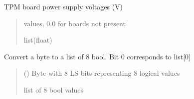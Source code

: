 \documentclass[letterpaper,10pt,english]{sphinxmanual}
\begin{document}
\begin{fulllineitems}
\label{\detokenize{webserverdocs:subrack_hardware.TpmVoltages}}
\pysigstartsignatures
{}
\pysigstopsignatures
\sphinxAtStartPar
TPM board power supply voltages (V)

\begin{fulllineitems}
\label{\detokenize{webserverdocs:subrack_hardware.TpmVoltages.read_value}}
\pysigstartsignatures
{}
\pysigstopsignatures\begin{quote}\begin{description}
 values, 0.0 for boards not present

\sphinxAtStartPar
list(float)

\end{description}\end{quote}

\end{fulllineitems}


\end{fulllineitems}


\begin{fulllineitems}
\label{\detokenize{webserverdocs:subrack_hardware.byte_to_bool_array}}
\pysigstartsignatures
{}
\pysigstopsignatures
\sphinxAtStartPar
Convert a byte to a list of 8 bool. Bit 0 corresponds to list{[}0{]}
\begin{quote}\begin{description}
\sphinxAtStartPar
{} () \textendash{} Byte with 8 LS bits representing 8 logical values

\sphinxAtStartPar
list of 8 bool values

\end{description}\end{quote}

\end{fulllineitems}
\end{document}
